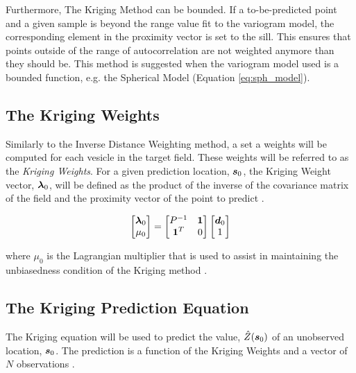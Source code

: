 \noindent Furthermore, The Kriging Method can be bounded. If a to-be-predicted point and a given sample is beyond the range value fit to the variogram model, the corresponding element in the proximity vector is set to the sill. This ensures that points outside of the range of autocorrelation are not weighted anymore than they should be. This method is suggested when the variogram model used is a bounded function, e.g. the Spherical Model (Equation \ref{eq:sph_model}).

\subsection{The Kriging Weights} \label{sec:krigweights}
Similarly to the Inverse Distance Weighting method, a set a weights will be computed for each vesicle in the target field. These weights will be referred to as the \textit{Kriging Weights}. For a given prediction location, ${\it{\boldsymbol{s}}}_0$, the Kriging Weight vector, ${\it{\boldsymbol{\lambda}}}_0$, will be defined as the product of the inverse of the covariance matrix of the field and the proximity vector of the point to predict \cite{felus:srn}.

\begin{equation}
    \begin{bmatrix}
    {\it{\boldsymbol{\lambda}}}_{0} \\
    \mu_0
    \end{bmatrix} = \begin{bmatrix} P^{-1} & {\it{\boldsymbol{1}}} \\
                                    {\it{\boldsymbol{1}}}^T & 0 \end{bmatrix}
                                    \begin{bmatrix} 
                                    {\it{\boldsymbol{d}}}_{0} \\
                                    1
                                    \end{bmatrix}
    \label{eq:krigweights}
\end{equation}

\noindent where $\mu_0$ is the Lagrangian multiplier that is used to assist in maintaining the unbiasedness condition of the Kriging method \cite{felus:srn}. 

\subsection{The Kriging Prediction Equation}
The Kriging equation will be used to predict the value, $\hat{Z}({\it{\boldsymbol{s}}}_0)$ of an unobserved location, ${\it{\boldsymbol{s}}}_0$. The prediction is a function of the Kriging Weights and a vector of $N$ observations \cite{felus:srn}. 

